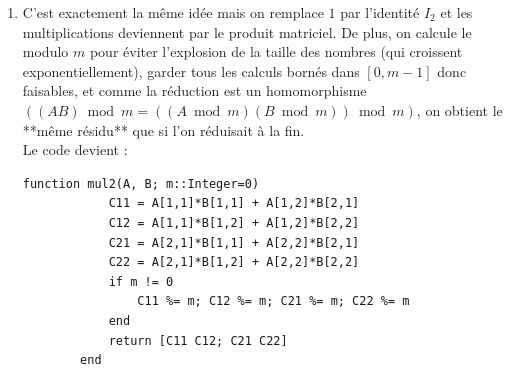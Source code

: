 \begin{solution}
\begin{enumerate}
        Par exemple $3^{13}$:
        \begin{enumerate}
            \item $\texttt{res} = 1$ ; $\texttt{base} = 3$ ;  $\texttt{exp} = 13$
            \item \texttt{exp} est impair ; $\texttt{res} = 1 * 3 = 3$ ;$\texttt{base} = 3^2 = 9$ ;  $\texttt{exp} = 6$
            \item \texttt{exp} est pair ; $\texttt{res} = 3$ ;$\texttt{base} = 9^2 = 81$ ;  $\texttt{exp} = 3$
            \item \texttt{exp} est impair ; $\texttt{res} = 3 * 81 = 243$ ;$\texttt{base} = 81^2 = 6561$ ;  $\texttt{exp} = 1$
            \item \texttt{exp} est impair ; $\texttt{res} = 6561 * 243 = 1594323$ ;$\texttt{base} = 6561^2 = 43046721$ ;  $\texttt{exp} = 0$
        \end{enumerate}

        On a donc $3^{13} = 1594323$. \\

        \begin{lstlisting}[basicstyle=\ttfamily\small, mathescape=true]
        function pow_fast(a, n::Integer)
            n < 0 && throw(ArgumentError("n => 0 requis"))
            res, base, exp = one(a), a, n
            while exp > 0
                if isodd(exp)
                    res *= base
                end
                base *= base
                exp >>= 1
            end
            return res
        end
        \end{lstlisting}

        \item C'est exactement la même idée mais on remplace $1$ par l'identité $I_2$ et les multiplications deviennent par le produit matriciel. 
        De plus, on calcule le modulo $m$ pour éviter l’explosion de la taille des nombres (qui croissent exponentiellement), garder tous les calculs bornés dans $[0,m-1]$ donc faisables, et comme la réduction est un homomorphisme $((AB)\bmod m = ((A\bmod m)(B\bmod m))\bmod m)$, on obtient le **même résidu** que si l’on réduisait à la fin. \\

        Le code devient :
        \begin{lstlisting}[basicstyle=\ttfamily\small, mathescape=true]
        function mul2(A, B; m::Integer=0)
            C11 = A[1,1]*B[1,1] + A[1,2]*B[2,1]
            C12 = A[1,1]*B[1,2] + A[1,2]*B[2,2]
            C21 = A[2,1]*B[1,1] + A[2,2]*B[2,1]
            C22 = A[2,1]*B[1,2] + A[2,2]*B[2,2]
            if m != 0
                C11 %= m; C12 %= m; C21 %= m; C22 %= m
            end
            return [C11 C12; C21 C22]
        end


\end{lstlisting}
\end{enumerate}
\end{solution}
